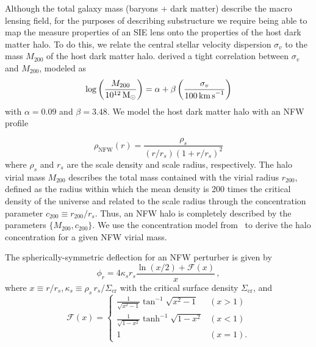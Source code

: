 \documentclass[twocolumn]{aastex62}
\begin{document}
Although the total galaxy mass (baryons + dark matter) describe the macro lensing field, for the purposes of describing substructure we require being able to map the measure properties of an SIE lens onto the properties of the host dark matter halo. To do this, we relate the central stellar velocity dispersion $\sigma_v$ to the mass $M_{200}$ of the host dark matter halo. \citet{2018ApJ...859...96Z} derived a tight correlation between $\sigma_v$ and $M_{200}$, modeled as
\begin{equation}
\log\left(\frac{M_{200}}{10^{12}\,\Msun}\right) = \alpha + \beta\left(\frac{\sigma_v}{100\,\kmps}\right)
\label{eq:sigma_v_M_200_relation}
\end{equation}
with $\alpha = 0.09$ and $\beta = 3.48$. %
We model the host dark matter halo with an NFW profile~\citep{1996ApJ...462..563N,1997ApJ...490..493N}

\begin{equation}
\rho_\mathrm{NFW}(r)=\frac{\rho_{s}}{\left(r / r_{s}\right)\left(1+r / r_{s}\right)^{2}}
\label{eq:rhoNFW}
\end{equation}
where $\rho_s$ and $r_s$ are the scale density and scale radius, respectively. The halo virial mass $M_{200}$ describes the total mass contained with the virial radius $r_{200}$, defined as the radius within which the mean density is 200 times the critical density of the universe and related to the scale radius through the concentration parameter $c_{200} \equiv r_{200}/r_s$. Thus, an NFW halo is completely described by the parameters $\{M_{200}, c_{200}\}$. We use the concentration model from~\citet{2014MNRAS.442.2271S} to derive the halo concentration for a given NFW virial mass.

The spherically-symmetric deflection for an NFW perturber is given by~\citep{2001astro.ph..2341K}
\begin{equation}
\phi_{r}=4 \kappa_{s} r_{s} \frac{\ln (x / 2)+\mathcal{F}(x)}{x} \,,
\label{eq:nfw_deflection}
\end{equation}
where $x \equiv r/r_s, \kappa_s\equiv \rho_s\,r_s/\Sigma_\mathrm{cr}$ with the critical surface density $\Sigma_\mathrm{cr}$, and
\begin{equation}
\mathcal{F}(x)=\left\{\begin{array}{ll}{\frac{1}{\sqrt{x^{2}-1}} \tan ^{-1} \sqrt{x^{2}-1}} & {(x>1)} \\ {\frac{1}{\sqrt{1-x^{2}}} \tanh ^{-1} \sqrt{1-x^{2}}} & {(x<1)} \\ {1} & {(x=1).}\end{array}\right.
\label{eq:Fx}
\end{equation}
\end{document}
